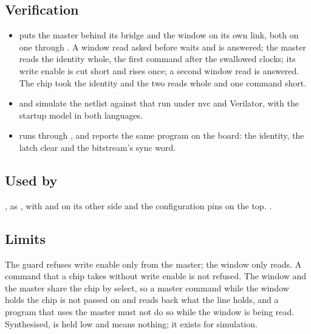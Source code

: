 \subsection*{Verification}

\begin{itemize}
\item {} puts the master behind its
bridge and the window on its own link, both on one 
through . A window read asked before  waits
and is answered; the master reads the identity  whole,
the first command after the swallowed clocks; its write enable is cut
short and  rises once; a second window read is answered.
The chip took the identity and the two reads whole and one command
short.
\item {} and
 simulate the netlist against that
run under nvc and Verilator, with the startup model in both languages.
\item {} runs
 through
, and  reports the same program on the
board: the identity, the latch clear and the bitstream's sync word.
\end{itemize}

\subsection*{Used by}

, as , with  and 
on its other side and the configuration pins on the top.
.

\subsection*{Limits}

The guard refuses write enable only from the master; the window only
reads. A command that a chip takes without write enable is not
refused. The window and the master share the chip by select, so a
master command while the window holds the chip is not passed on and
reads back what the line holds, and a program that uses the master
must not do so while the window is being read. Synthesised,
 is held low and means nothing; it exists for simulation.
